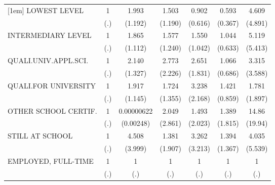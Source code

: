{\begin{tabular}{l*{6}{c}}
[1em]
LOWEST LEVEL                  &         1         &     1.993         &     1.503         &     0.902         &     0.593         &     4.609         \\
                              &       (.)         &   (1.192)         &   (1.190)         &   (0.616)         &   (0.367)         &   (4.891)         \\
[1em]
INTERMEDIARY LEVEL            &         1         &     1.865         &     1.577         &     1.550         &     1.044         &     5.119         \\
                              &       (.)         &   (1.112)         &   (1.240)         &   (1.042)         &   (0.633)         &   (5.413)         \\
[1em]
QUALI.UNIV.APPL.SCI.          &         1         &     2.140         &     2.773         &     2.651         &     1.066         &     3.315         \\
                              &       (.)         &   (1.327)         &   (2.226)         &   (1.831)         &   (0.686)         &   (3.588)         \\
[1em]
QUALI.FOR UNIVERSITY          &         1         &     1.917         &     1.724         &     3.238         &     1.421         &     1.781         \\
                              &       (.)         &   (1.145)         &   (1.355)         &   (2.168)         &   (0.859)         &   (1.897)         \\
[1em]
OTHER SCHOOL CERTIF.          &         1         &0.00000622         &     2.049         &     1.493         &     1.389         &     14.86\sym{*}  \\
                              &       (.)         & (0.00248)         &   (2.861)         &   (2.023)         &   (1.815)         &   (19.94)         \\
[1em]
STILL AT SCHOOL               &         1         &     4.508         &     1.381         &     3.262         &     1.394         &     4.035         \\
                              &       (.)         &   (3.999)         &   (1.907)         &   (3.213)         &   (1.367)         &   (5.539)         \\
[1em]
EMPLOYED, FULL-TIME           &         1         &         1         &         1         &         1         &         1         &         1         \\
                              &       (.)         &       (.)         &       (.)         &       (.)         &       (.)         &       (.)         \\

\end{tabular}}
